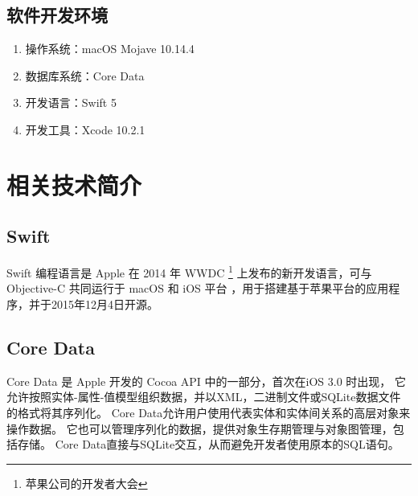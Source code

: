 \subsection{软件开发环境}

\begin{enumerate}
	\item 操作系统：macOS Mojave 10.14.4
	\item 数据库系统：Core Data
	\item 开发语言：Swift 5
	\item 开发工具：Xcode 10.2.1
\end{enumerate}

\section{相关技术简介}
\subsection{Swift}
Swift 编程语言是 Apple 在 2014 年 WWDC \footnote{苹果公司的开发者大会} 上发布的新开发语言，可与 Objective-C 共同运行于 macOS 和 iOS 平台
，用于搭建基于苹果平台的应用程序，并于2015年12月4日开源。
\subsection{Core Data}
Core Data 是 Apple 开发的 Cocoa API 中的一部分，首次在iOS 3.0 时出现，
它允许按照实体-属性-值模型组织数据，并以XML，二进制文件或SQLite数据文件的格式将其序列化。
Core Data允许用户使用代表实体和实体间关系的高层对象来操作数据。
它也可以管理序列化的数据，提供对象生存期管理与对象图管理，包括存储。
Core Data直接与SQLite交互，从而避免开发者使用原本的SQL语句。